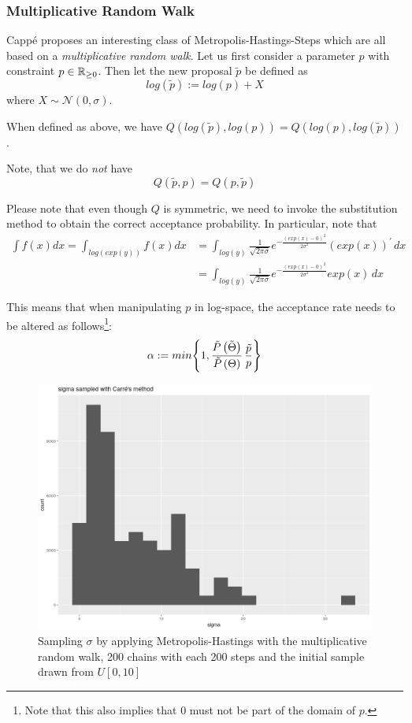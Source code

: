 \subsubsection{Multiplicative Random Walk}
Cappé \cite{cappe} proposes an interesting class of Metropolis-Hastings-Steps which are all based on a \textit{multiplicative random walk}. Let us first consider a parameter $p$ with constraint $p \in \mathbb{R}_{\geq 0}$. Then let the new proposal $\tilde{p}$ be defined as 
\[
	log\left(\tilde{p}\right) := log(p) + X
\]
where $X \sim \mathcal{N}(0, \sigma)$.

\begin{lemma}
	When defined as above, we have $Q\left(log(\tilde{p}), log(p)\right) = Q\left( log(p), log(\tilde{p})\right)$.
	
	Note, that we do \textit{not} have
	\[
	Q\left(\tilde{p}, p\right) = Q\left( p , \tilde{p}\right)
	\]
\end{lemma}

	 Please note that even though $Q$ is symmetric, we need to invoke the substitution method to obtain the correct acceptance probability. 
	 In particular, note that 
	 \begin{align*}
	 	\int f(x) dx = \int_{log(exp(y))} f(x) dx &= 
	 	\int_{log(y)} \frac{1}{\sqrt{2 \pi \sigma}} e^{- \frac{ \left(exp(x) - 0\right)^2}{2 \sigma^2}} \left(exp(x)\right)^{\prime}  \, dx\\
	 	&= \int_{log(y)} \frac{1}{\sqrt{2 \pi \sigma}} e^{- \frac{ \left(exp(x) - 0\right)^2}{2 \sigma^2}} exp(x) \, dx
	 \end{align*} 
	 
	 This means that when manipulating $p$ in log-space, the acceptance rate needs to be altered as follows\footnote{Note that this also implies that $0$ must not be part of the domain of $p$. }:
	 \[
	 	\alpha := min \Bigg\{ 
	 		1, \frac{\tilde{P}\left(\tilde{\Theta}\right)}{\tilde{P}\left(\Theta\right)} \, \frac{\tilde{p}}{p}
	 		\Bigg\}
	 \]
	 
	 \begin{figure}
	 	\includegraphics[height=0.3\textheight]{img/carre_sigma_biased.png}
	 	\caption{Sampling $\sigma$ by applying Metropolis-Hastings with the multiplicative random walk, 200 chains with each 200 steps and the initial sample drawn from $U[0, 10]$}
	 	\label{fig:carre_sigma_not_uniform}
	 \end{figure}
	 
